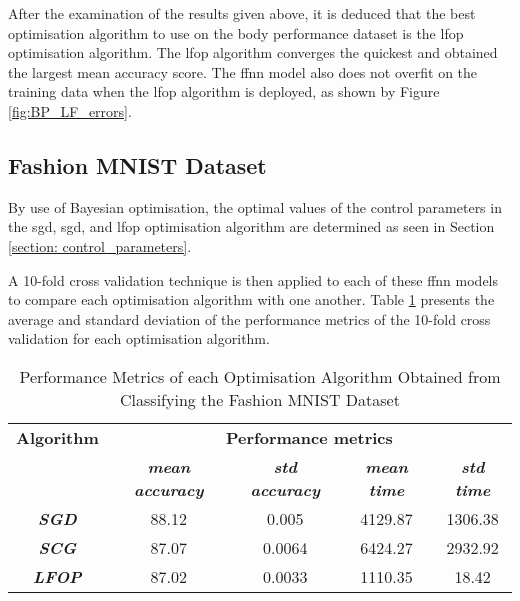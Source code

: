\documentclass[10pt, conference]{IEEEtran}
\begin{document}
After the examination of the results given above, it is deduced that the best optimisation algorithm
to use on the body performance dataset is the \acrshort{lfop} optimisation algorithm. The \acrshort{lfop}
algorithm converges the quickest and obtained the largest mean accuracy score. The \acrshort{ffnn} model
also does not overfit on the training data when the \acrshort{lfop} algorithm is deployed,
as shown by Figure \ref{fig:BP_LF_errors}.

\subsection{Fashion MNIST Dataset}

By use of Bayesian optimisation, the optimal values of the control parameters in the
\acrshort{sgd}, \acrshort{sgd}, and \acrshort{lfop} optimisation algorithm are determined as seen in
Section \ref{section: control_parameters}.

A 10-fold cross validation technique is then applied to each of these \acrshort{ffnn} models to compare each
optimisation algorithm with one another. Table \ref{table: FM_performance_metrics} presents the average
and standard deviation of the performance metrics of the 10-fold cross validation for each optimisation algorithm.
\begin{table}[H]
    \caption{Performance Metrics of each Optimisation Algorithm Obtained from Classifying the Fashion MNIST Dataset}
    \begin{center}
        \begin{tabular}{|c||c|c|c|c|}
            \hline
            \textbf{Algorithm}&\multicolumn{4}{|c|}{\textbf{Performance metrics}} \\
            \cline{2-5}
                        & \textbf{\textit{mean accuracy}} & \textbf{\textit{std accuracy}} & \textbf{\textit{mean time}} & \textbf{\textit{std time}}\\
            \hline
            \textbf{\textit{SGD}}  & 88.12 & 0.005 & 4129.87 & 1306.38\\
            \textbf{\textit{SCG}}  & 87.07 & 0.0064 & 6424.27 & 2932.92\\
            \textbf{\textit{LFOP}} & 87.02 & 0.0033 & 1110.35 & 18.42\\
            \hline
        \end{tabular}
    \end{center}
    \label{table: FM_performance_metrics}
\end{table}
\end{document}
